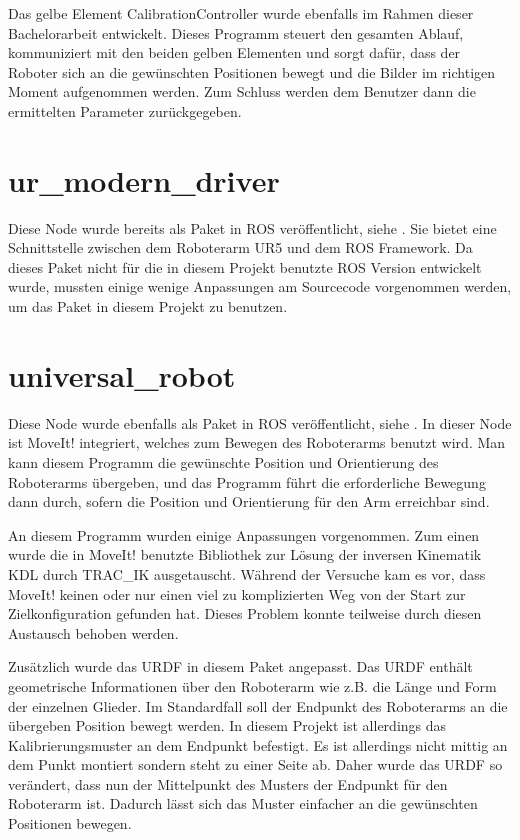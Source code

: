 Das gelbe Element CalibrationController wurde ebenfalls im Rahmen dieser Bachelorarbeit entwickelt. Dieses Programm steuert den gesamten Ablauf, kommuniziert mit den beiden gelben Elementen und sorgt dafür, dass der Roboter sich an die gewünschten Positionen bewegt und die Bilder im richtigen Moment aufgenommen werden. Zum Schluss werden dem Benutzer dann die ermittelten Parameter zurückgegeben.

\section{ur\_modern\_driver} %
\label{sec:ur_modern_driver}
Diese Node wurde bereits als Paket in ROS veröffentlicht, siehe \cite{ur_modern_driver}. Sie bietet eine Schnittstelle zwischen dem Roboterarm UR5 und dem ROS Framework. Da dieses Paket nicht für die in diesem Projekt benutzte ROS Version entwickelt wurde, mussten einige wenige Anpassungen am Sourcecode vorgenommen werden, um das Paket in diesem Projekt zu benutzen.

\section{universal\_robot} %
\label{sec:universal_robot}
Diese Node wurde ebenfalls als Paket in ROS veröffentlicht, siehe \cite{universal_robot}. In dieser Node ist MoveIt! integriert, welches zum Bewegen des Roboterarms benutzt wird. Man kann diesem Programm die gewünschte Position und Orientierung des Roboterarms übergeben, und das Programm führt die erforderliche Bewegung dann durch, sofern die Position und Orientierung für den Arm erreichbar sind.

An diesem Programm wurden einige Anpassungen vorgenommen. Zum einen wurde die in MoveIt! benutzte Bibliothek zur Lösung der inversen Kinematik KDL durch TRAC\_IK ausgetauscht. Während der Versuche kam es vor, dass MoveIt! keinen oder nur einen viel zu komplizierten Weg von der Start zur Zielkonfiguration gefunden hat. Dieses Problem konnte teilweise durch diesen Austausch behoben werden.

Zusätzlich wurde das URDF in diesem Paket angepasst. Das URDF enthält geometrische Informationen über den Roboterarm wie z.B. die Länge und Form der einzelnen Glieder. Im Standardfall soll der Endpunkt des Roboterarms an die übergeben Position bewegt werden. In diesem Projekt ist allerdings das Kalibrierungsmuster an dem Endpunkt befestigt. Es ist allerdings nicht mittig an dem Punkt montiert sondern steht zu einer Seite ab. Daher wurde das URDF so verändert, dass nun der Mittelpunkt des Musters der Endpunkt für den Roboterarm ist. Dadurch lässt sich das Muster einfacher an die gewünschten Positionen bewegen.

